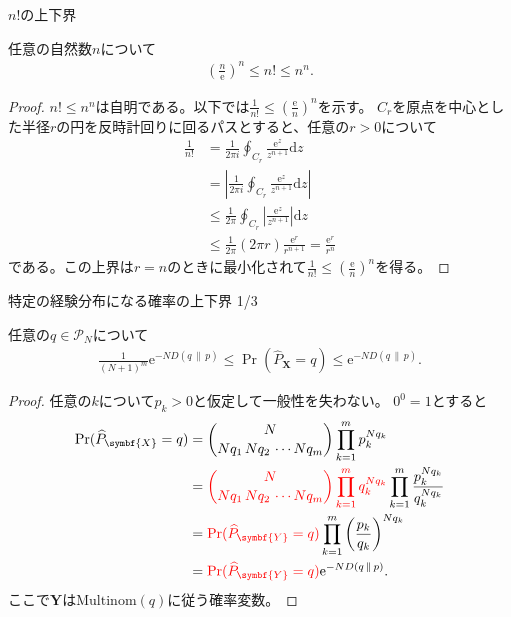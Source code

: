 \documentclass[lualatex,handout]{beamer}
\newcommand{\mycolor}[2]{%
  \begingroup
  \colorlet{currentcolor}{.}%
  \color{#1}#2%
  \color{currentcolor}%
  \endgroup
}
\newcommand{\emm}[1]{\mycolor{red}{#1}}
\newcommand\KL[2]{D(#1\,\|\,#2)}
\theoremstyle{definition}
\begin{document}
\begin{frame}{$n!$の上下界}
\footnotesize
\begin{lemma}
任意の自然数$n$について
\begin{align*}
\left(\frac{n}{\mathrm{e}}\right)^n\le n!\le n^n.
\end{align*}
\vspace{-1em}
\begin{proof}
$n!\le n^n$は自明である。以下では$\frac1{n!}\le \left(\frac{\mathrm{e}}{n}\right)^n$を示す。
%
$C_r$を原点を中心とした半径$r$の円を反時計回りに回るパスとすると、任意の$r>0$について
\begin{align*}
\frac1{n!} &= \frac1{2\pi i} \oint_{C_r} \frac{\mathrm{e}^z}{z^{n+1}}\mathrm{d}z\\
 &= \left|\frac1{2\pi i} \oint_{C_r} \frac{\mathrm{e}^z}{z^{n+1}}\mathrm{d}z\right|\\
&\le \frac1{2\pi } \oint_{C_r} \left|\frac{\mathrm{e}^z}{z^{n+1}}\right|\mathrm{d}z\\
&\le \frac1{2\pi } (2\pi r) \frac{\mathrm{e}^r}{r^{n+1}} = \frac{\mathrm{e}^r}{r^n}
\end{align*}
である。この上界は$r=n$のときに最小化されて$\frac1{n!}\le\left(\frac{\mathrm{e}}{n}\right)^n$を得る。
\end{proof}
\end{lemma}
\end{frame}
\fi

\begin{frame}{特定の経験分布になる確率の上下界 1/3}
\footnotesize
\begin{lemma}
任意の$q\in\mathcal{P}_N$について
\begin{align*}
\frac1{(N+1)^m}\mathrm{e}^{-N \KL{q}{p}}\le
\Pr(\widehat{P}_{\symbf{X}} = q)
\le \mathrm{e}^{-N \KL{q}{p}}.
\end{align*}
\end{lemma}
\begin{proof}
任意の$k$について$p_k>0$と仮定して一般性を失わない。
$0^0=1$とすると
\begin{align*}
\Pr(\widehat{P}_{\symbf{X}}= q) &= \binom{N}{Nq_1\,Nq_2\,\dotsm Nq_m} \prod_{k=1}^m p_k^{Nq_k}\\
 &= \emm{\binom{N}{Nq_1\,Nq_2\,\dotsm Nq_m} \prod_{k=1}^m q_k^{Nq_k}}\prod_{k=1}^m\frac{p_k^{Nq_k}}{q_k^{Nq_k}}\\
 &= \emm{\Pr(\widehat{P}_{\symbf{Y}}= q)}\prod_{k=1}^m\left(\frac{p_k}{q_k}\right)^{Nq_k}\\
 &=\emm{\Pr(\widehat{P}_{\symbf{Y}}= q)}\mathrm{e}^{-N \KL{q}{p}}.
\end{align*}
ここで$\symbf{Y}$は$\mathrm{Multinom}(q)$に従う確率変数。
\end{proof}
\end{frame}
\end{document}
